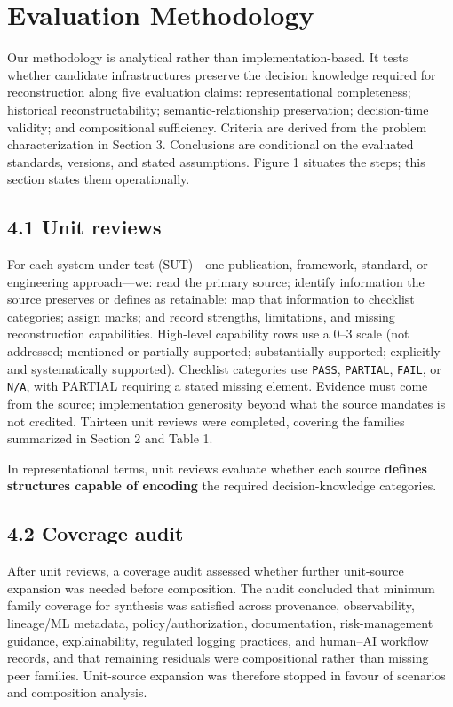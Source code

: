 \documentclass[11pt,a4paper]{article}
\begin{document}
\section{Evaluation Methodology}

Our methodology is analytical rather than implementation-based. It tests whether candidate infrastructures preserve the decision knowledge required for reconstruction along five evaluation claims: representational completeness; historical reconstructability; semantic-relationship preservation; decision-time validity; and compositional sufficiency. Criteria are derived from the problem characterization in Section 3. Conclusions are conditional on the evaluated standards, versions, and stated assumptions. Figure 1 situates the steps; this section states them operationally.


\subsection{4.1 Unit reviews}

For each system under test (SUT)---one publication, framework, standard, or engineering approach---we: read the primary source; identify information the source preserves or defines as retainable; map that information to checklist categories; assign marks; and record strengths, limitations, and missing reconstruction capabilities. High-level capability rows use a 0--3 scale (not addressed; mentioned or partially supported; substantially supported; explicitly and systematically supported). Checklist categories use \texttt{PASS}, \texttt{PARTIAL}, \texttt{FAIL}, or \texttt{N/A}, with PARTIAL requiring a stated missing element. Evidence must come from the source; implementation generosity beyond what the source mandates is not credited. Thirteen unit reviews were completed, covering the families summarized in Section 2 and Table 1.


In representational terms, unit reviews evaluate whether each source \textbf{defines structures capable of encoding} the required decision-knowledge categories.


\subsection{4.2 Coverage audit}

After unit reviews, a coverage audit assessed whether further unit-source expansion was needed before composition. The audit concluded that minimum family coverage for synthesis was satisfied across provenance, observability, lineage/ML metadata, policy/authorization, documentation, risk-management guidance, explainability, regulated logging practices, and human--AI workflow records, and that remaining residuals were compositional rather than missing peer families. Unit-source expansion was therefore stopped in favour of scenarios and composition analysis.
\end{document}
